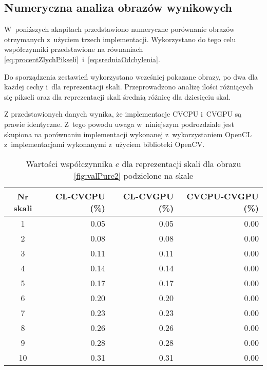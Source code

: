 \subsection{Numeryczna analiza obrazów wynikowych}
\label{subsec:porownanieNumerycznePoprawnosc}

W~poniższych akapitach przedstawiono numeryczne porównanie obrazów otrzymanych z~użyciem trzech implementacji. Wykorzystano do tego celu współczynniki przedstawione na równaniach \eqref{eq:procentZlychPikseli}~i~\eqref{eq:sredniaOdchylenia}.

Do sporządzenia zestawień wykorzystano wcześniej pokazane obrazy, po dwa dla każdej cechy i~dla reprezentacji skali. Przeprowadzono analizę ilości różniących się pikseli oraz dla reprezentacji skali średnią różnicę dla dziesięciu skal. 

Z przedstawionych danych wynika, że implementacje CVCPU i~CVGPU są prawie identyczne. Z~tego powodu uwaga w~niniejszym podrozdziale jest skupiona na porównaniu implementacji wykonanej z~wykorzystaniem OpenCL z~implementacjami wykonanymi z~użyciem biblioteki OpenCV.

\begin{center}
\begin{table}
\centering
\caption{Wartości współczynnika $ e $ dla reprezentacji skali dla obrazu \ref{fig:valPure2} podzielone na skale}
\label{tab:imageScaleRep2}
\begin{tabular}{|c|r|r|r|}
 \hline
Nr skali & CL-CVCPU (\%) & CL-CVGPU (\%) & CVCPU-CVGPU (\%) \\ \hline
1        & 0.05     & 0.05     & 0.00        \\ \hline
2        & 0.08     & 0.08     & 0.00        \\ \hline
3        & 0.11     & 0.11     & 0.00        \\ \hline
4        & 0.14     & 0.14     & 0.00        \\ \hline
5        & 0.17     & 0.17     & 0.00        \\ \hline
6        & 0.20     & 0.20     & 0.00        \\ \hline
7        & 0.23     & 0.23     & 0.00        \\ \hline
8        & 0.26     & 0.26     & 0.00        \\ \hline
9        & 0.28     & 0.28     & 0.00        \\ \hline
10       & 0.31     & 0.31     & 0.00        \\ \hline
\end{tabular}
\end{table}
\end{center}


